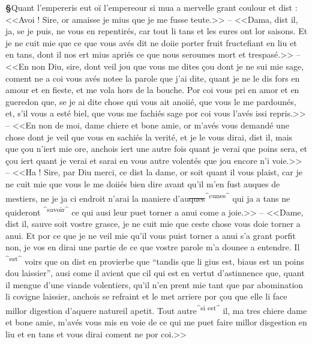 \documentclass[12pt]{article} %
\newcommand{\add}[1]{\textsuperscript{#1}}       %
\newcommand{\del}[1]{\sout{#1}}      %
\newcounter{paranum}
\newcommand{\pnum}{\stepcounter{paranum}\textbf{§\arabic{paranum}}\quad}
\begin{document}
\pnum Quant l'empereris eut oï l'empereour si mua a mervelle grant coulour et dist : <<Avoi ! Sire, or amaisse je mius que je me fusse teute.>> -- <<Dama, dist il, ja, se je puis, ne vous en repentirés, car tout li tans et les eures ont lor saisons. Et je ne cuit mie que ce que vous avés dit ne doiie porter fruit fructefiant en liu et en tans, dont il nos ert mius apriés ce que nous seroumes mort et trespasé.>> -- <<En non Diu, sire, dont veil jou que vous me dites çou dont je ne sui mie sage, coment ne a coi vous avés notee la parole que j'ai dite, quant je ne le dis fors en amour et en fieste, et me vola hors de la bouche. Por coi vous pri en amor et en gueredon que, se je ai dite chose qui vous ait anoiié, que vous le me pardounés, et, s'il vous a esté biel, que vous me fachiés sage por coi vous l'avés issi repris.>> -- <<En non de moi, dame chiere et bone amie, or m'avés vous demandé une chose dont je veil que vous en sachiés la verité, et je le vous dirai, dist il, mais que çou n'iert mie ore, anchois iert une autre fois quant je verai que poins sera, et çou iert quant je verai et sarai en vous autre volentés que jou encore n'i voie.>> -- <<Ha ! Sire, par Diu merci, ce dist la dame, or soit quant il vous plaist, car je ne cuit mie que vous le me doiiés bien dire avant qu'il m'en fust auques de mestiers, ne je ja ci endroit n'arai la maniere d'au\del{ques}\add{^cunes^} qui ja a tans ne quideront \add{^savoir^} ce qui ausi leur puet torner a anui come a joie.>> -- <<Dame, dist il, sauve soit vostre grasce, je ne cuit mie que ceste chose vous doie torner a anui. Et por ce que je ne veil mie qu'il vous puist torner a anui s'a grant porfit non, je vos en dirai une partie de ce que vostre parole m'a dounee a entendre. Il \add{^est^} voirs que on dist en provierbe que ``tandis que li gius est, biaus est un poins dou laissier'', ausi come il avient que cil qui est en vertut d'astinnence que, quant il mengue d'une viande volentiers, qu'il n'en prent mie tant que par abomination li covigne laissier, anchois se refraint et le met arriere por çou que elle li face millor digestion d'aquere natureil apetit. Tout autre\add{^si est^} il, ma tres chiere dame et bone amie, m'avés vous mis en voie de ce qui me puet faire millor disgestion en liu et en tans et vous dirai coment ne por coi.>>
\end{document}

